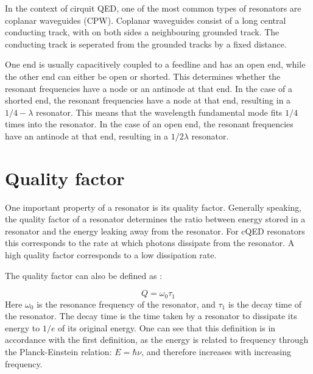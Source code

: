 \documentclass[12pt]{report}
\begin{document}
In the context of cirquit QED, one of the most common types of resonators are coplanar waveguides (CPW). Coplanar waveguides consist of a long central conducting track, with on both sides a neighbouring grounded track. The conducting track is seperated from the grounded tracks by a fixed distance.

One end is usually capacitively coupled to a feedline and has an open end, while the other end can either be open or shorted. This determines whether the resonant frequencies have a node or an antinode at that end. In the case of a shorted end, the resonant frequencies have a node at that end, resulting in a  $1/4 - \lambda$ resonator. This means that the wavelength fundamental mode fits $1/4$ times into the resonator. In the case of an open end, the resonant frequencies have an antinode at that end, resulting in a $1/2 \lambda$ resonator.









\section{Quality factor}
\label{sec:Quality factor}
One important property of a resonator is its quality factor. Generally speaking, the quality factor of a resonator determines the ratio between energy stored in a resonator and the energy leaking away from the resonator. For cQED resonators this corresponds to the rate at which photons dissipate from the resonator. A high quality factor corresponds to a low dissipation rate.

The quality factor can also be defined as \cite[p.~23]{Mazin}:

\begin{equation}
    Q = \omega_0 \tau_1
\end{equation}
Here $\omega_0$ is the resonance frequency of the resonator, and $\tau_1$ is the decay time of the resonator. The decay time is the time taken by a resonator to dissipate its energy to $1/e$ of its original energy. One can see that this definition is in accordance with the first definition, as the energy is related to frequency through the Planck-Einstein relation: $E = \hbar \nu$, and therefore increases with increasing frequency.
\end{document}
